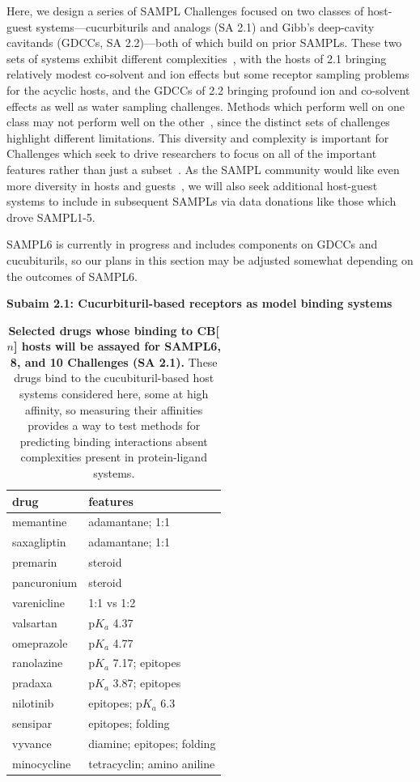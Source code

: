 \documentclass[11pt]{article}
\begin{document}
Here, we design a series of SAMPL Challenges focused on two classes of host-guest systems---cucurbiturils and analogs (SA 2.1) and Gibb's deep-cavity cavitands (GDCCs, SA 2.2)---both of which build on prior SAMPLs.
These two sets of systems exhibit different complexities~\cite{Mobley:2017:AnnualReviewofBiophysics}, with the hosts of 2.1 bringing relatively modest co-solvent and ion effects but some receptor sampling problems for the acyclic hosts, and the GDCCs of 2.2 bringing profound ion and co-solvent effects as well as water sampling challenges.
Methods which perform well on one class may not perform well on the other~\cite{Mobley:2017:AnnualReviewofBiophysics}, since the distinct sets of challenges highlight different limitations.
This diversity and complexity is important for Challenges which seek to drive researchers to focus on all of the important features rather than just a subset~\cite{Saez-Rodriguez:2016:NatRevGenet}.
As the SAMPL community would like even more diversity in hosts and guests~\cite{Mobley:2017:eScholarship}, we will also seek additional host-guest systems to include in subsequent SAMPLs via data donations like those which drove SAMPL1-5.

SAMPL6 is currently in progress and includes components on GDCCs and cucubiturils, so our plans in this section may be adjusted somewhat depending on the outcomes of SAMPL6.

\textbf{Subaim 2.1: Cucurbituril-based receptors as model binding systems}

\begin{table}
\vspace{-0.2in}
\footnotesize
\begin{tabular}{l | l}
{\bf drug} & {\bf features} \\
\hline
memantine & adamantane; 1:1 \\
saxagliptin & adamantane; 1:1 \\
premarin & steroid \\
pancuronium & steroid\\
varenicline & 1:1 vs 1:2 \\
valsartan & p$K_a$ 4.37 \\ 
omeprazole & p$K_a$ 4.77 \\
ranolazine & p$K_a$ 7.17; epitopes \\
pradaxa & p$K_a$ 3.87; epitopes \\
nilotinib & epitopes; p$K_a$ 6.3 \\
sensipar & epitopes; folding \\
vyvance & diamine; epitopes; folding \\
minocycline & tetracyclin; amino aniline \\
\end{tabular}
\caption{\textbf{\label{table:CB} Selected drugs whose binding to CB[$n$] hosts will be assayed for SAMPL6, 8, and 10 Challenges (SA 2.1).}  %
These drugs bind to the cucubituril-based host systems considered here, some at high affinity, so measuring their affinities provides a way to test methods for predicting binding interactions absent complexities present in protein-ligand systems.
}
\vspace{-0.1in}
\end{table}
\end{document}
